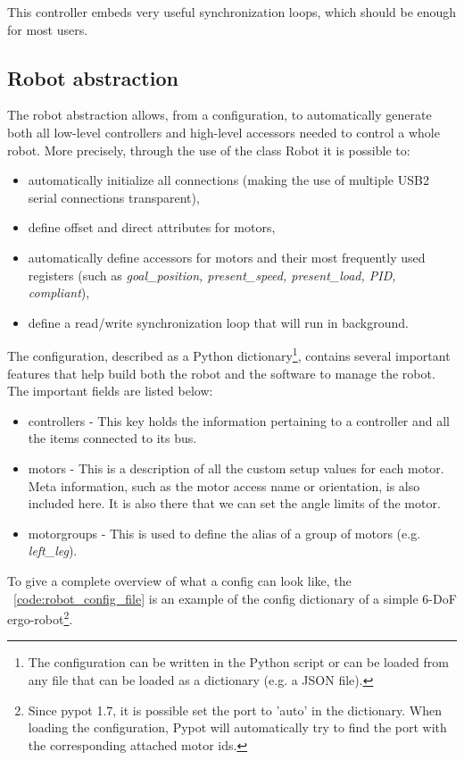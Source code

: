 This controller embeds very useful synchronization loops, which should be enough for most users.



\subsection{Robot abstraction} %
\label{sec:pypot-robot-abstraction}
The robot abstraction allows, from a configuration, to automatically generate both all low-level controllers and high-level accessors needed to control a whole robot. More precisely, through the use of the class Robot it is possible to:

\begin{itemize}
    \item automatically initialize all connections (making the use of multiple USB2 serial connections transparent),
    \item define offset and direct attributes for motors,
    \item automatically define accessors for motors and their most frequently used registers (such as \emph{goal\_position, present\_speed, present\_load, PID, compliant}),
    \item define a read/write synchronization loop that will run in background.
\end{itemize}

The configuration, described as a Python dictionary\footnote{The configuration can be written in the Python script or can be loaded from any file that can be loaded as a dictionary (e.g. a JSON file).}, contains several important features that help build both the robot and the software to manage the robot. The important fields are listed below:

\begin{itemize}
    \item controllers - This key holds the information pertaining to a controller and all the items connected to its bus.
    \item motors - This is a description of all the custom setup values for each motor. Meta information, such as the motor access name or orientation, is also included here. It is also there that we can set the angle limits of the motor.
    \item motorgroups - This is used to define the alias of a group of motors (e.g. \emph{left\_leg}).
\end{itemize}

To give a complete overview of what a config can look like, the \codename~\ref{code:robot_config_file} is an example of the config dictionary of a simple 6-DoF ergo-robot\footnote{Since pypot 1.7, it is possible set the port to 'auto' in the dictionary. When loading the configuration, Pypot will automatically try to find the port with the corresponding attached motor ids.}.


